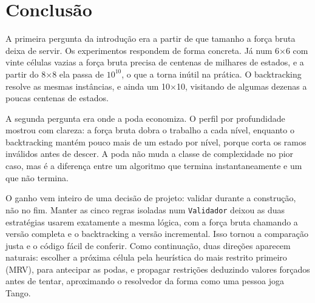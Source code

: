 \documentclass[12pt]{article}
\begin{document}
\section{Conclusão}
\label{sec:conclusao}

A primeira pergunta da introdução era a partir de que tamanho a força bruta deixa de servir. Os experimentos respondem de forma concreta. Já num 6$\times$6 com vinte células vazias a força bruta precisa de centenas de milhares de estados, e a partir do 8$\times$8 ela passa de $10^{10}$, o que a torna inútil na prática. O backtracking resolve as mesmas instâncias, e ainda um 10$\times$10, visitando de algumas dezenas a poucas centenas de estados.

A segunda pergunta era onde a poda economiza. O perfil por profundidade mostrou com clareza: a força bruta dobra o trabalho a cada nível, enquanto o backtracking mantém pouco mais de um estado por nível, porque corta os ramos inválidos antes de descer. A poda não muda a classe de complexidade no pior caso, mas é a diferença entre um algoritmo que termina instantaneamente e um que não termina.

O ganho vem inteiro de uma decisão de projeto: validar durante a construção, não no fim. Manter as cinco regras isoladas num \texttt{Validador} deixou as duas estratégias usarem exatamente a mesma lógica, com a força bruta chamando a versão completa e o backtracking a versão incremental. Isso tornou a comparação justa e o código fácil de conferir. Como continuação, duas direções aparecem naturais: escolher a próxima célula pela heurística do mais restrito primeiro (MRV), para antecipar as podas, e propagar restrições deduzindo valores forçados antes de tentar, aproximando o resolvedor da forma como uma pessoa joga Tango.
\end{document}
